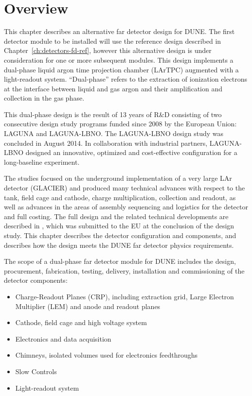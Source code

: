 \section{Overview}
\label{sec:detectors-fd-alt-ov}

This chapter describes an alternative far detector design for
DUNE. The first detector module to be installed will use the reference
design described in Chapter~\ref{ch:detectors-fd-ref}, however this alternative
 design is under consideration for one or more
subsequent modules. This design implements a dual-phase liquid argon
time projection chamber (LArTPC) augmented with a light-readout
system. ``Dual-phase'' refers to the extraction of ionization
electrons at the interface between liquid and gas argon and their
amplification and collection in the gas phase.

This dual-phase design is the result of 13 years of R\&D consisting of two
consecutive design study programs funded since 2008 by the European
Union: LAGUNA and LAGUNA-LBNO. The LAGUNA-LBNO design study was
concluded in August 2014.  In collaboration with industrial partners,
LAGUNA-LBNO designed an innovative, optimized and cost-effective
configuration for a long-baseline experiment.

The studies focused on the underground implementation of a very large
LAr detector (GLACIER) and produced many technical advances with respect to
the tank, field cage and cathode, charge multiplication, collection and readout, as well as 
advances in the areas of assembly sequencing and logistics for the detector and 
full costing. The full design and the related
technical developments are described in \anxlbnob, which was submitted to the
EU at the conclusion of the design study. This chapter describes the detector
configuration and components, and describes how the design meets the DUNE
far detector physics requirements.

The scope of a dual-phase far detector module for DUNE includes the design,
procurement, fabrication, testing, delivery, installation and
commissioning of the detector components:
\begin{itemize}
\item Charge-Readout Planes (CRP), including extraction grid, Large Electron Multiplier (LEM) and anode and readout planes
\item Cathode, field cage and high voltage system  
\item Electronics and data acquisition 
\item Chimneys, isolated volumes used for electronics feedthroughs 
\item Slow Controls
\item Light-readout system
\end{itemize}

